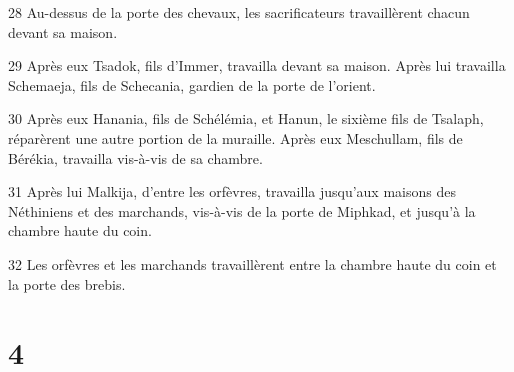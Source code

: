 \par 28 Au-dessus de la porte des chevaux, les sacrificateurs travaillèrent chacun devant sa maison.
\par 29 Après eux Tsadok, fils d'Immer, travailla devant sa maison. Après lui travailla Schemaeja, fils de Schecania, gardien de la porte de l'orient.
\par 30 Après eux Hanania, fils de Schélémia, et Hanun, le sixième fils de Tsalaph, réparèrent une autre portion de la muraille. Après eux Meschullam, fils de Bérékia, travailla vis-à-vis de sa chambre.
\par 31 Après lui Malkija, d'entre les orfèvres, travailla jusqu'aux maisons des Néthiniens et des marchands, vis-à-vis de la porte de Miphkad, et jusqu'à la chambre haute du coin.
\par 32 Les orfèvres et les marchands travaillèrent entre la chambre haute du coin et la porte des brebis.

\chapter{4}

